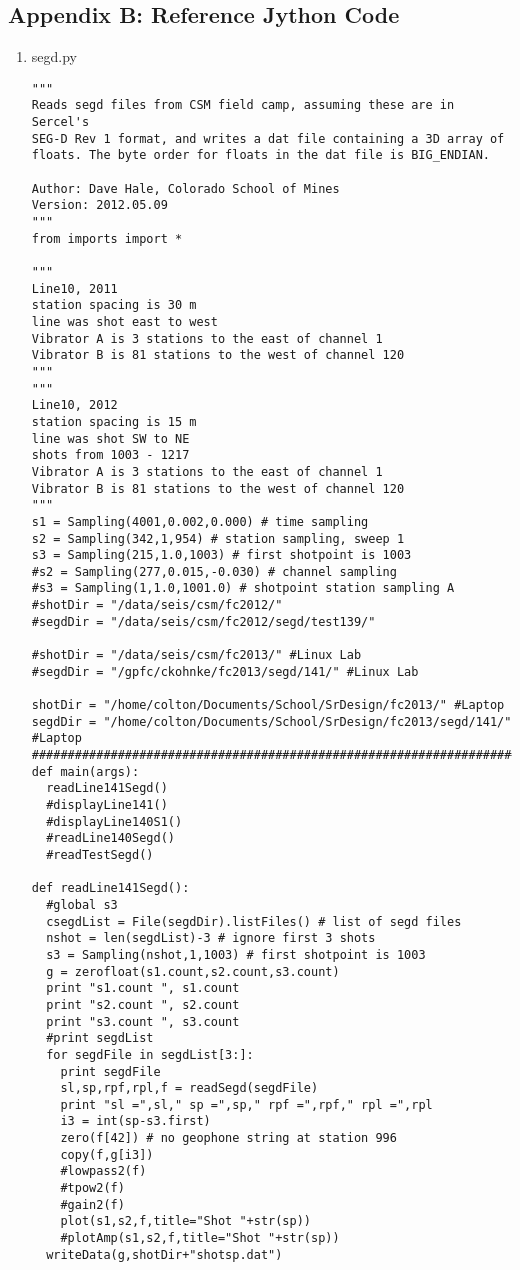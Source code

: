 \documentclass[11pt]{article}
\begin{document}
\subsection{Appendix B: Reference Jython Code}
\begin{enumerate}
\item segd.py
\begin{lstlisting}
"""
Reads segd files from CSM field camp, assuming these are in Sercel's 
SEG-D Rev 1 format, and writes a dat file containing a 3D array of 
floats. The byte order for floats in the dat file is BIG_ENDIAN. 

Author: Dave Hale, Colorado School of Mines
Version: 2012.05.09
"""
from imports import *

"""
Line10, 2011
station spacing is 30 m
line was shot east to west
Vibrator A is 3 stations to the east of channel 1
Vibrator B is 81 stations to the west of channel 120
"""
"""
Line10, 2012
station spacing is 15 m
line was shot SW to NE
shots from 1003 - 1217
Vibrator A is 3 stations to the east of channel 1
Vibrator B is 81 stations to the west of channel 120
"""
s1 = Sampling(4001,0.002,0.000) # time sampling
s2 = Sampling(342,1,954) # station sampling, sweep 1
s3 = Sampling(215,1.0,1003) # first shotpoint is 1003
#s2 = Sampling(277,0.015,-0.030) # channel sampling
#s3 = Sampling(1,1.0,1001.0) # shotpoint station sampling A
#shotDir = "/data/seis/csm/fc2012/"
#segdDir = "/data/seis/csm/fc2012/segd/test139/"

#shotDir = "/data/seis/csm/fc2013/" #Linux Lab
#segdDir = "/gpfc/ckohnke/fc2013/segd/141/" #Linux Lab

shotDir = "/home/colton/Documents/School/SrDesign/fc2013/" #Laptop
segdDir = "/home/colton/Documents/School/SrDesign/fc2013/segd/141/" #Laptop
#############################################################################
def main(args):
  readLine141Segd()
  #displayLine141()
  #displayLine140S1()
  #readLine140Segd()
  #readTestSegd()

def readLine141Segd():
  #global s3
  csegdList = File(segdDir).listFiles() # list of segd files
  nshot = len(segdList)-3 # ignore first 3 shots
  s3 = Sampling(nshot,1,1003) # first shotpoint is 1003
  g = zerofloat(s1.count,s2.count,s3.count)
  print "s1.count ", s1.count
  print "s2.count ", s2.count
  print "s3.count ", s3.count
  #print segdList
  for segdFile in segdList[3:]:
    print segdFile
    sl,sp,rpf,rpl,f = readSegd(segdFile)
    print "sl =",sl," sp =",sp," rpf =",rpf," rpl =",rpl
    i3 = int(sp-s3.first)
    zero(f[42]) # no geophone string at station 996
    copy(f,g[i3])
    #lowpass2(f)
    #tpow2(f)
    #gain2(f)
    plot(s1,s2,f,title="Shot "+str(sp))
    #plotAmp(s1,s2,f,title="Shot "+str(sp))
  writeData(g,shotDir+"shotsp.dat")


\end{lstlisting}
\end{enumerate}
\end{document}
